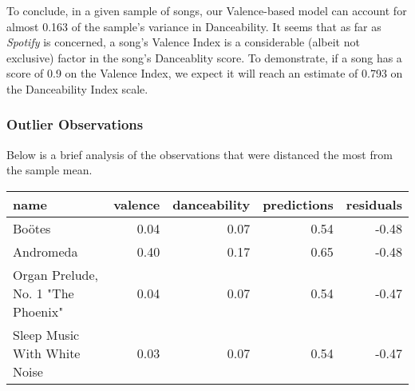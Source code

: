 \documentclass[
]{article}
\begin{document}
To conclude, in a given sample of songs, our Valence-based model can
account for almost 0.163 of the sample's variance in Danceability. It
seems that as far as \emph{Spotify} is concerned, a song's Valence Index
is a considerable (albeit not exclusive) factor in the song's
Danceablity score. To demonstrate, if a song has a score of 0.9 on the
Valence Index, we expect it will reach an estimate of 0.793 on the
Danceability Index scale.

\hypertarget{outlier-observations}{%
\subsubsection{Outlier Observations}\label{outlier-observations}}

Below is a brief analysis of the observations that were distanced the
most from the sample mean.

\begin{table}
\centering\begingroup\fontsize{10}{12}\selectfont

\begin{tabular}[t]{l|r|r|r|r}
\hline
name & valence & danceability & predictions & residuals\\
\hline
Boötes & 0.04 & 0.07 & 0.54 & -0.48\\
\hline
Andromeda & 0.40 & 0.17 & 0.65 & -0.48\\
\hline
Organ Prelude, No. 1 "The Phoenix" & 0.04 & 0.07 & 0.54 & -0.47\\
\hline
Sleep Music With White Noise & 0.03 & 0.07 & 0.54 & -0.47\\
\hline
\end{tabular}
\endgroup{}
\end{table}

\pagebreak
\end{document}
